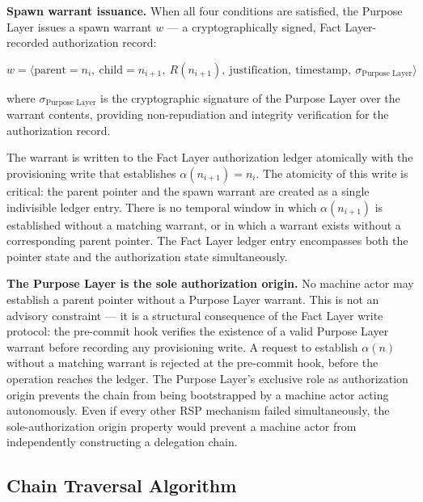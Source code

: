 \bigskip
\noindent\textbf{Spawn warrant issuance.} When all four conditions are satisfied, the Purpose Layer issues a spawn warrant $w$ --- a cryptographically signed, Fact Layer-recorded authorization record:

\begin{equation}
w = \bigl\langle \text{parent}=n_i,\ \text{child}=n_{i+1},\ R(n_{i+1}),\ \text{justification},\ \text{timestamp},\ \sigma_{\text{Purpose Layer}} \bigr\rangle
\label{eq:spawn-warrant}
\end{equation}

where $\sigma_{\text{Purpose Layer}}$ is the cryptographic signature of the Purpose Layer over the warrant contents, providing non-repudiation and integrity verification for the authorization record.

The warrant is written to the Fact Layer authorization ledger atomically with the provisioning write that establishes $\alpha(n_{i+1}) = n_i$. The atomicity of this write is critical: the parent pointer and the spawn warrant are created as a single indivisible ledger entry. There is no temporal window in which $\alpha(n_{i+1})$ is established without a matching warrant, or in which a warrant exists without a corresponding parent pointer. The Fact Layer ledger entry encompasses both the pointer state and the authorization state simultaneously.

\bigskip
\noindent\textbf{The Purpose Layer is the sole authorization origin.} No machine actor may establish a parent pointer without a Purpose Layer warrant. This is not an advisory constraint --- it is a structural consequence of the Fact Layer write protocol: the pre-commit hook verifies the existence of a valid Purpose Layer warrant before recording any provisioning write. A request to establish $\alpha(n)$ without a matching warrant is rejected at the pre-commit hook, before the operation reaches the ledger. The Purpose Layer's exclusive role as authorization origin prevents the chain from being bootstrapped by a machine actor acting autonomously. Even if every other RSP mechanism failed simultaneously, the sole-authorization origin property would prevent a machine actor from independently constructing a delegation chain.

\subsection{Chain Traversal Algorithm}
\label{sec:chain-traversal}

